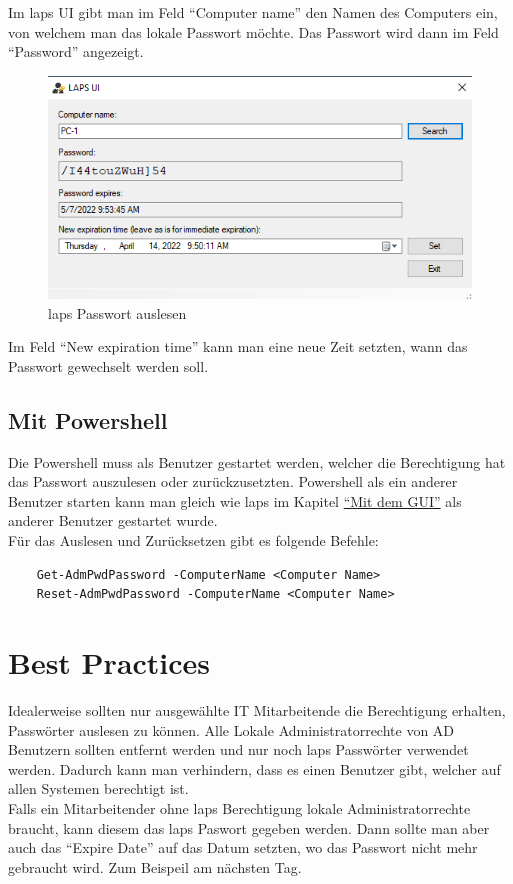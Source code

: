 Im \acrshort{laps} UI gibt man im Feld ``Computer name'' den Namen des Computers ein, von welchem man das lokale Passwort möchte.
Das Passwort wird dann im Feld ``Password'' angezeigt.
\begin{figure}[H]
    \centering
    \includegraphics[width=0.7\linewidth]{../img/LAPS/Laps-ui.png}
    \caption{\acrshort{laps} Passwort auslesen}
\end{figure}
Im Feld ``New expiration time'' kann man eine neue Zeit setzten, wann das Passwort gewechselt werden soll.

\subsection{Mit Powershell}
Die Powershell muss als Benutzer gestartet werden, welcher die Berechtigung hat das Passwort auszulesen oder zurückzusetzten.
Powershell als ein anderer Benutzer starten kann man gleich wie \acrshort{laps} im Kapitel \hyperref[subsec:laps-gui-usage]{``Mit dem GUI''} als anderer Benutzer gestartet wurde.\\

Für das Auslesen und Zurücksetzen gibt es folgende Befehle:
\begin{lstlisting}
    Get-AdmPwdPassword -ComputerName <Computer Name>
    Reset-AdmPwdPassword -ComputerName <Computer Name>
\end{lstlisting}


\section{Best Practices}
Idealerweise sollten nur ausgewählte IT Mitarbeitende die Berechtigung erhalten, Passwörter auslesen zu können.
Alle Lokale Administratorrechte von AD Benutzern sollten entfernt werden und nur noch \acrshort{laps} Passwörter verwendet werden.
Dadurch kann man verhindern, dass es einen Benutzer gibt, welcher auf allen Systemen berechtigt ist.\\

Falls ein Mitarbeitender ohne \acrshort{laps} Berechtigung lokale Administratorrechte braucht, kann diesem das \acrshort{laps} Paswort gegeben werden.
Dann sollte man aber auch das ``Expire Date'' auf das Datum setzten, wo das Passwort nicht mehr gebraucht wird.
Zum Beispeil am nächsten Tag.

